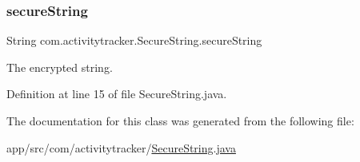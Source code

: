 \subsubsection{\texorpdfstring{secure\+String}{secureString}}
{\footnotesize\ttfamily String com.\+activitytracker.\+Secure\+String.\+secure\+String\hspace{0.3cm}{\ttfamily [private]}}

The encrypted string. 

Definition at line 15 of file Secure\+String.\+java.



The documentation for this class was generated from the following file\+:\begin{DoxyCompactItemize}
\item 
app/src/com/activitytracker/\mbox{\hyperlink{_secure_string_8java}{Secure\+String.\+java}}\end{DoxyCompactItemize}
